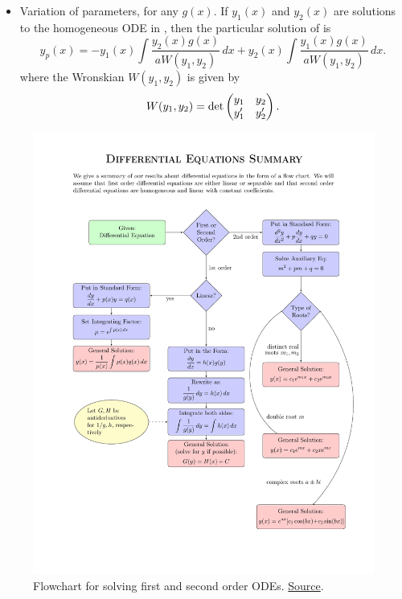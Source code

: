 \begin{itemize}
	\item Variation of parameters, for any $g(x)$. If $y_1(x)$ and $y_2(x)$ are solutions to the homogeneous ODE in , then the particular solution of  is
	\[
	y_p(x) = -y_1(x)\int\frac{y_2(x)g(x)}{aW(y_1,y_2)}\,dx + y_2(x)\int\frac{y_1(x)g(x)}{aW(y_1,y_2)}\,dx.
	\]
	where the Wronskian $W(y_1,y_2)$ is given by
	\[
	W(y_1, y_2) = \det\begin{pmatrix}y_1 & y_2 \\ y_1' & y_2'\end{pmatrix}.
	\]
\end{itemize}

\begin{figure}
	\centering
	\includegraphics[width=\linewidth]{img/RevisionFlowchart}
	\caption{Flowchart for solving first and second order ODEs. \href{http://courses.enriqueareyan.com/files/math/M343\%20Introduction\%20to\%20Differential\%20Equations\%20I/Resources/DifferentialEquations-Flowchart.pdf}{Source}.}
	\label{fig:revisionflowchart}
\end{figure}


